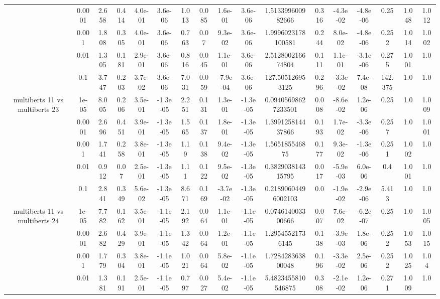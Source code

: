 \begin{tabular}{|c|c|c|c|c|c|c|c|c|c|c|c|c|c|c|c|c|}
 & 0.0001 & 2.658 & 0.414 & 4.0e-01 & 3.6e-06 & 1.013 & 0.085 & 1.6e-01 & 3.6e-06 & 1.513399600982666 & 0.316 & -4.3e-02 & -4.8e-06 & 0.25 & 1.048 & 1.012 \\
 & 0.001 & 1.808 & 0.305 & 4.0e-01 & 3.6e-06 & 0.763 & 0.07 & 9.3e-02 & 3.6e-06 & 1.9996023178100581 & 0.244 & 8.0e-02 & -4.8e-06 & 0.252 & 1.014 & 1.002 \\
 & 0.01 & 1.305 & 0.181 & 2.9e-01 & 3.6e-06 & 0.816 & 0.045 & 1.1e-01 & 3.6e-06 & 2.512800216674804 & 0.111 & 1.1e-01 & -3.1e-06 & 0.275 & 1.001 & 1.0 \\
 & 0.1 & 3.747 & 0.203 & 3.7e-02 & 3.6e-06 & 7.031 & 0.059 & -7.9e-04 & 3.6e-06 & 127.505126953125 & 0.296 & -3.3e-02 & 7.4e-08 & 142.375 & 1.0 & 1.0 \\
\hline
\multirow{5}{*}{multiberts 11 vs multiberts 23} & 1e-05 & 8.005 & 0.206 & 3.5e-01 & -1.3e-05 & 2.251 & 0.131 & 1.3e-01 & -1.3e-05 & 0.09405698627233501 & 0.008 & -8.6e-02 & 1.2e-06 & 0.25 & 1.0 & 1.009 \\
 & 0.0001 & 2.696 & 0.451 & 3.9e-01 & -1.3e-05 & 1.565 & 0.137 & 1.8e-01 & -1.3e-05 & 1.399125814437866 & 0.193 & 1.7e-02 & -3.3e-06 & 0.257 & 1.0 & 1.001 \\
 & 0.001 & 1.741 & 0.258 & 3.8e-01 & -1.3e-05 & 1.19 & 0.138 & 9.4e-02 & -1.3e-05 & 1.565185546875 & 0.177 & 9.3e-02 & -1.3e-06 & 0.251 & 1.002 & 1.0 \\
 & 0.01 & 0.912 & 0.07 & 2.5e-01 & -1.3e-05 & 1.11 & 0.122 & 9.5e-02 & -1.3e-05 & 0.382903814315795 & 0.017 & -5.9e-03 & 6.0e-06 & 0.4 & 1.001 & 1.0 \\
 & 0.1 & 2.841 & 0.349 & 5.6e-02 & -1.3e-05 & 8.671 & 0.169 & -3.7e-02 & -1.3e-05 & 0.21890604496002103 & 0.0 & -1.9e-02 & -2.9e-06 & 5.413 & 1.0 & 1.0 \\
\hline
\multirow{5}{*}{multiberts 11 vs multiberts 24} & 1e-05 & 7.782 & 0.162 & 3.5e-01 & -1.1e-05 & 2.192 & 0.064 & 1.1e-01 & -1.1e-05 & 0.074614003300666 & 0.007 & 7.6e-02 & -6.2e-07 & 0.25 & 1.0 & 1.005 \\
 & 0.0001 & 2.682 & 0.429 & 3.9e-01 & -1.1e-05 & 1.342 & 0.064 & 1.2e-01 & -1.1e-05 & 1.29545521736145 & 0.138 & -3.9e-03 & 1.8e-06 & 0.252 & 1.053 & 1.015 \\
 & 0.001 & 1.779 & 0.304 & 3.8e-01 & -1.1e-05 & 1.021 & 0.064 & 5.8e-02 & -1.1e-05 & 1.728428363800048 & 0.196 & -3.3e-02 & 2.5e-06 & 0.252 & 1.025 & 1.04 \\
 & 0.01 & 1.381 & 0.191 & 2.5e-01 & -1.1e-05 & 0.797 & 0.027 & 5.4e-02 & -1.1e-05 & 5.4823455810546875 & 0.308 & -2.1e-02 & 1.2e-06 & 0.271 & 1.009 & 1.0 \\

\end{tabular}
